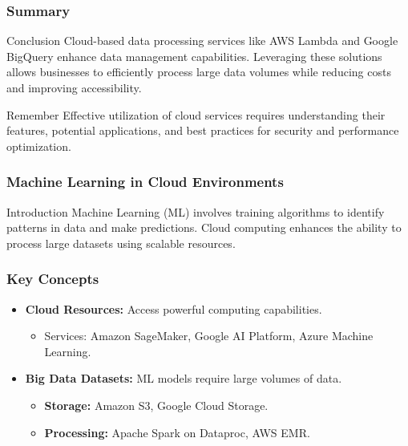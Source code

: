 \documentclass[aspectratio=169]{beamer}
\begin{document}
\begin{frame}[fragile]
    \frametitle{Summary}
    \begin{block}{Conclusion}
        Cloud-based data processing services like AWS Lambda and Google BigQuery enhance data management capabilities. Leveraging these solutions allows businesses to efficiently process large data volumes while reducing costs and improving accessibility.
    \end{block}
    \begin{block}{Remember}
        Effective utilization of cloud services requires understanding their features, potential applications, and best practices for security and performance optimization.
    \end{block}
\end{frame}

\begin{frame}[fragile]
    \frametitle{Machine Learning in Cloud Environments}
    \begin{block}{Introduction}
        Machine Learning (ML) involves training algorithms to identify patterns in data and make predictions. Cloud computing enhances the ability to process large datasets using scalable resources.
    \end{block}
\end{frame}

\begin{frame}[fragile]
    \frametitle{Key Concepts}
    \begin{itemize}
        \item \textbf{Cloud Resources:} Access powerful computing capabilities.
        \begin{itemize}
            \item Services: Amazon SageMaker, Google AI Platform, Azure Machine Learning.
        \end{itemize}
        \item \textbf{Big Data Datasets:} ML models require large volumes of data.
        \begin{itemize}
            \item \textbf{Storage:} Amazon S3, Google Cloud Storage.
            \item \textbf{Processing:} Apache Spark on Dataproc, AWS EMR.
        \end{itemize}
    \end{itemize}
\end{frame}
\end{document}
